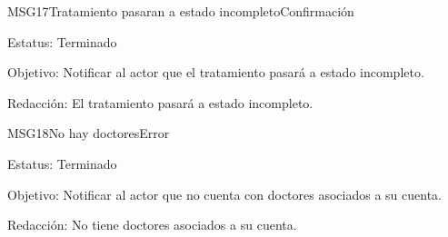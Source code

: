 \begin{mensaje}{MSG17}{Tratamiento pasaran a estado incompleto}{Confirmación}
	\item[Estatus:] Terminado
	\item[Objetivo:] Notificar al actor que el tratamiento pasará a estado incompleto.
	\item[Redacción:] El tratamiento pasará a estado incompleto.
\end{mensaje}

\begin{mensaje}{MSG18}{No hay doctores}{Error}
	\item[Estatus:] Terminado
	\item[Objetivo:] Notificar al actor que no cuenta con doctores asociados a su cuenta.
	\item[Redacción:] No tiene doctores asociados a su cuenta.
\end{mensaje}

